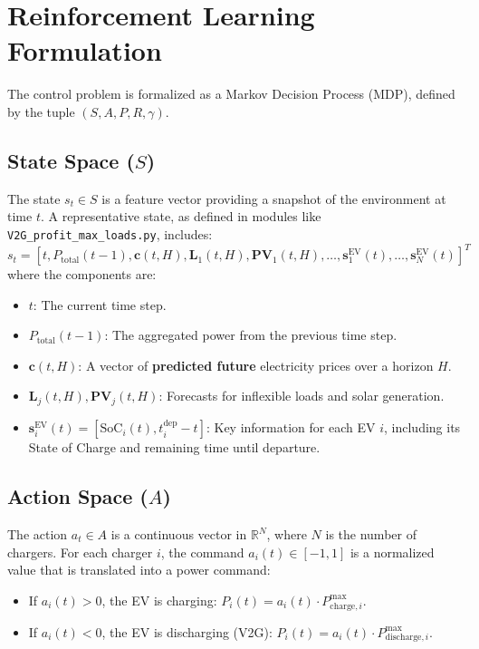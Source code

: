 \section{Reinforcement Learning Formulation}
The control problem is formalized as a Markov Decision Process (MDP), defined by the tuple $(S, A, P, R, \gamma)$.

\subsection{State Space ($S$)}
The state $s_t \in S$ is a feature vector providing a snapshot of the environment at time $t$. A representative state, as defined in modules like \texttt{V2G\_profit\_max\_loads.py}, includes:
\[
 s_t = [t, P_{\text{total}}(t-1), \mathbf{c}(t, H), \mathbf{L}_1(t, H), \mathbf{PV}_1(t, H), \dots, \mathbf{s}^{\text{EV}}_1(t), \dots, \mathbf{s}^{\text{EV}}_N(t)]^T
\]
where the components are:
\begin{itemize}
    \item $t$: The current time step.
    \item $P_{\text{total}}(t-1)$: The aggregated power from the previous time step.
    \item $\mathbf{c}(t, H)$: A vector of \textbf{predicted future} electricity prices over a horizon $H$.
    \item $\mathbf{L}_j(t, H), \mathbf{PV}_j(t, H)$: Forecasts for inflexible loads and solar generation.
    \item $\mathbf{s}^{\text{EV}}_i(t) = [\text{SoC}_i(t), t^{\text{dep}}_i - t]$: Key information for each EV $i$, including its State of Charge and remaining time until departure.
\end{itemize}

\subsection{Action Space ($A$)}
The action $a_t \in A$ is a continuous vector in $\mathbb{R}^N$, where $N$ is the number of chargers. For each charger $i$, the command $a_i(t) \in [-1, 1]$ is a normalized value that is translated into a power command:
\begin{itemize}
    \item If $a_i(t) > 0$, the EV is charging: $P_i(t) = a_i(t) \cdot P^{\text{max}}_{\text{charge}, i}$.
    \item If $a_i(t) < 0$, the EV is discharging (V2G): $P_i(t) = a_i(t) \cdot P^{\text{max}}_{\text{discharge}, i}$.
\end{itemize}

